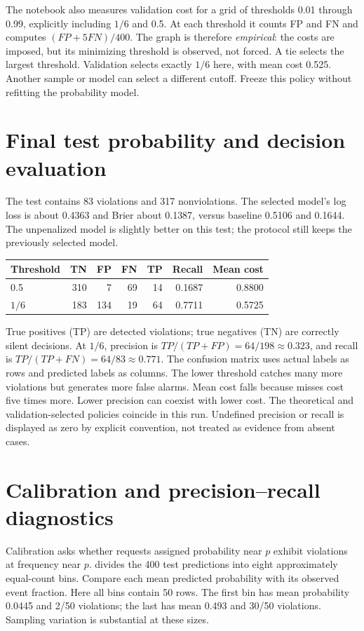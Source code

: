 The notebook also measures validation cost for a grid of thresholds 0.01 through 0.99, explicitly including $1/6$ and 0.5. At each threshold it counts FP and FN and computes $(FP+5FN)/400$. The graph is therefore \emph{empirical}: the costs are imposed, but its minimizing threshold is observed, not forced. A tie selects the largest threshold.
Validation selects exactly $1/6$ here, with mean cost 0.525. Another sample or model can select a different cutoff. Freeze this policy without refitting the probability model.

\section{Final test probability and decision evaluation}
The test contains 83 violations and 317 nonviolations. The selected model's log loss is about 0.4363 and Brier about 0.1387, versus baseline 0.5106 and 0.1644. The unpenalized model is slightly better on this test; the protocol still keeps the previously selected model.
\begin{center}
\begin{tabular}{lrrrrrr}\toprule
Threshold&TN&FP&FN&TP&Recall&Mean cost\\\midrule
0.5&310&7&69&14&0.1687&0.8800\\
$1/6$&183&134&19&64&0.7711&0.5725\\\bottomrule
\end{tabular}
\end{center}
True positives (TP) are detected violations; true negatives (TN) are correctly silent decisions. At $1/6$, precision is $TP/(TP+FP)=64/198\approx0.323$, and recall is $TP/(TP+FN)=64/83\approx0.771$. The confusion matrix uses actual labels as rows and predicted labels as columns.
The lower threshold catches many more violations but generates more false alarms. Mean cost falls because misses cost five times more. Lower precision can coexist with lower cost. The theoretical and validation-selected policies coincide in this run. Undefined precision or recall is displayed as zero by explicit convention, not treated as evidence from absent cases.

\section{Calibration and precision--recall diagnostics}
Calibration asks whether requests assigned probability near $p$ exhibit violations at frequency near $p$.  divides the 400 test predictions into eight approximately equal-count bins. Compare each mean predicted probability with its observed event fraction. Here all bins contain 50 rows. The first bin has mean probability 0.0445 and 2/50 violations; the last has mean 0.493 and 30/50 violations. Sampling variation is substantial at these sizes.

